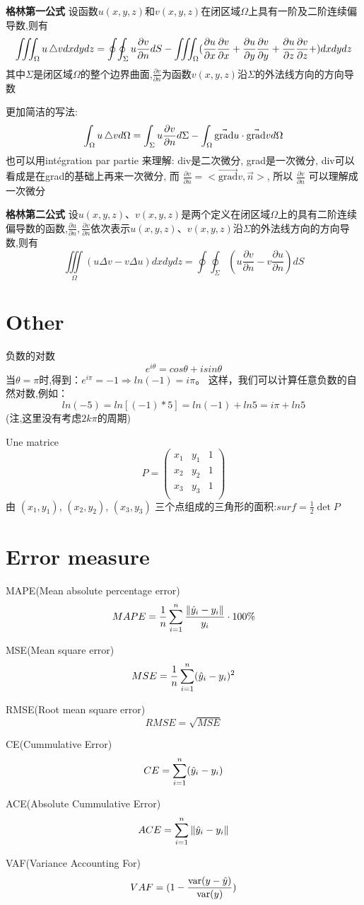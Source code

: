 \documentclass{book}
\begin{document}
\bigskip
\textbf{格林第一公式}
设函数$u(x,y,z)$和$v(x,y,z)$在闭区域$\Omega$上具有一阶及二阶连续偏导数,则有
$$\iiint_{\Omega} u\mathop{}\!\mathbin\bigtriangleup v dxdydz
=
\oint\!\oint_{\Sigma} u \frac{\partial v}{\partial n}dS -
\iiint_{\Omega}(
\frac{\partial  u}{\partial x}\frac{\partial v}{\partial x}+
\frac{\partial  u}{\partial y}\frac{\partial v}{\partial y}+
\frac{\partial  u}{\partial z}\frac{\partial v}{\partial z}+
)dxdydz$$
其中$\Sigma$是闭区域$\Omega$的整个边界曲面,$\frac{\partial v}{\partial n}$为函数$v(x,y,z)$沿$\Sigma$的外法线方向的方向导数

更加简洁的写法:
$$
\int_{\Omega}u \mathop{}\!\mathbin\bigtriangleup v d\Omega = \int_{\Sigma}u \frac{\partial v}{\partial n}d\Sigma - \int_{\Omega} \vec{\mbox{grad}}u \cdot \vec{\mbox{grad}} v d\Omega
$$
也可以用int\'egration par partie 来理解:
div是二次微分, grad是一次微分, div可以看成是在grad的基础上再来一次微分, 而
$ \frac{\partial  v}{\partial n} = <\vec{\mbox{grad}} v,\vec{n}>$, 所以
$\frac{\partial  v}{\partial n}$ 可以理解成一次微分

\bigskip
\textbf{格林第二公式}
设$u(x,y,z)$、$v(x,y,z)$是两个定义在闭区域$\Omega$上的具有二阶连续偏导数的函数,$\frac{\partial u}{\partial n},\frac{\partial v}{\partial n}$依次表示$u(x,y,z)$、$v(x,y,z)$沿$\Sigma$的外法线方向的方向导数,则有
$$\iiint\limits_{\Omega}(u\Delta v - v\Delta u)dxdydz=\oint\!\oint_{\Sigma}(u \frac{\partial v}{\partial n}-v\frac{\partial u}{\partial n})dS$$

\section{Other}
负数的对数
$$e^{i\theta}=cos\theta+isin\theta$$
当$\theta=\pi$时,得到：$e^{i\pi}=-1\Rightarrow ln(-1)=i\pi$。
这样，我们可以计算任意负数的自然对数,例如：
$$ln(-5)=ln[(-1)*5]=ln(-1)+ln5=i\pi+ln5$$
(注,这里没有考虑$2k\pi$的周期)

Une matrice
$$
P=
\left(
             \begin{array}{ccc}
               x_1 & y_1 & 1 \\
               x_2 & y_2 & 1 \\
               x_3 & y_3 & 1 \\
             \end{array}
          \right)
$$
由 $(x_1,y_1)$, $(x_2,y_2)$, $(x_3,y_3)$ 三个点组成的三角形的面积:$surf = \frac{1}{2}\det{P}$

\section{Error measure}
MAPE(Mean absolute percentage error)
$$ MAPE = \dfrac{1}{n} \sum_{i=1}^n \dfrac{\left\Vert \hat{y}_i - y_i\right\Vert}{y_i} \cdot 100\%$$

MSE(Mean square error)
$$MSE = \dfrac{1}{n} \sum_{i=1}^n (\hat{y}_i - y_i)^2$$

RMSE(Root mean square error)
$$RMSE  = \sqrt{MSE}$$

CE(Cummulative Error)
$$CE = \sum_{i=1}^n (\hat{y}_i - y_i)$$

ACE(Absolute Cummulative Error)
$$ACE = \sum_{i=1}^n \left\Vert \hat{y}_i - y_i\right\Vert$$

VAF(Variance Accounting For)
$$VAF = (1 - \dfrac{\operatorname{var}(y - \hat{y})}{\operatorname{var}(y)})$$
\end{document}
